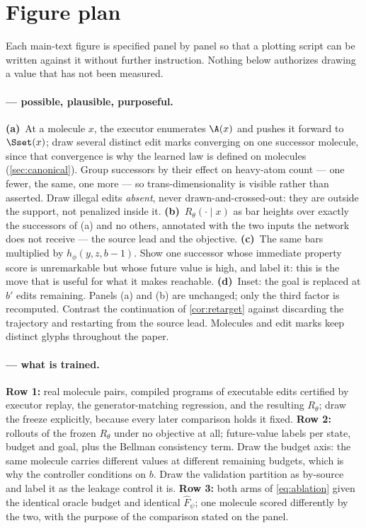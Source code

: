 
\section{Figure plan}
\label{app:figplan}

Each main-text figure is specified panel by panel so that a plotting script can be written against it without further instruction. Nothing below authorizes drawing a value that has not been measured.

\paragraph{ --- possible, plausible, purposeful.}
\textbf{(a)}~At a molecule $x$, the executor enumerates $\A(x)$ and pushes it forward to $\Sset(x)$; draw several distinct edit marks converging on one successor molecule, since that convergence is why the learned law is defined on molecules (\cref{sec:canonical}). Group successors by their effect on heavy-atom count --- one fewer, the same, one more --- so trans-dimensionality is visible rather than asserted. Draw illegal edits \emph{absent}, never drawn-and-crossed-out: they are outside the support, not penalized inside it.
\textbf{(b)}~$R_\theta(\cdot\mid x)$ as bar heights over exactly the successors of (a) and no others, annotated with the two inputs the network does not receive --- the source lead and the objective.
\textbf{(c)}~The same bars multiplied by $h_\phi(y,z,b-1)$. Show one successor whose immediate property score is unremarkable but whose future value is high, and label it: this is the move that is useful for what it makes reachable.
\textbf{(d)}~Inset: the goal is replaced at $b'$ edits remaining. Panels (a) and (b) are unchanged; only the third factor is recomputed. Contrast the continuation of \cref{cor:retarget} against discarding the trajectory and restarting from the source lead.
Molecules and edit marks keep distinct glyphs throughout the paper.

\paragraph{ --- what is trained.}
\textbf{Row 1:} real molecule pairs, compiled programs of executable edits certified by executor replay, the generator-matching regression, and the resulting $R_\theta$; draw the freeze explicitly, because every later comparison holds it fixed.
\textbf{Row 2:} rollouts of the frozen $R_\theta$ under no objective at all; future-value labels per state, budget and goal, plus the Bellman consistency term. Draw the budget axis: the same molecule carries different values at different remaining budgets, which is why the controller conditions on $b$. Draw the validation partition as by-source and label it as the leakage control it is.
\textbf{Row 3:} both arms of \eqref{eq:ablation} given the identical oracle budget and identical $\widehat F_\psi$; one molecule scored differently by the two, with the purpose of the comparison stated on the panel.

